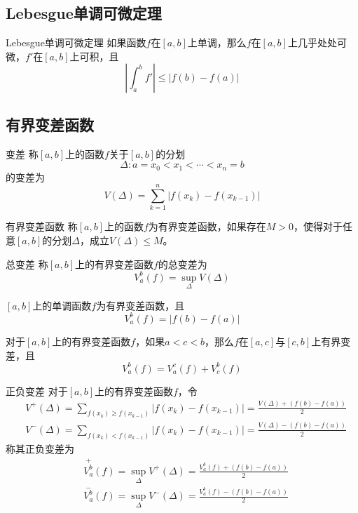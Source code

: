 \documentclass[lang = cn, scheme = chinese, thmcnt = section]{elegantbook}
\begin{document}
\subsection{Lebesgue单调可微定理}

\begin{theorem}{Lebesgue单调可微定理}
	如果函数$f$在$[a,b]$上单调，那么$f$在$[a,b]$上几乎处处可微，$f'$在$[a,b]$上可积，且
	$$
	\left| \int_{a}^{b}f' \right|\le|f(b)-f(a)|
	$$
\end{theorem}

\subsection{有界变差函数}

\begin{definition}{变差}
	称$[a,b]$上的函数$f$关于$[a,b]$的分划%
	$$
	\Delta: a=x_0<x_1<\cdots<x_n=b
	$$
	的变差为%
	$$
	V(\Delta)=\sum_{k=1}^{n}|f(x_k)-f(x_{k-1})|
	$$
\end{definition}

\begin{definition}{有界变差函数}
	称$[a,b]$上的函数$f$为有界变差函数，如果存在$M>0$，使得对于任意$[a,b]$的分划$\Delta$，成立$V(\Delta)\le M$。
\end{definition}

\begin{definition}{总变差}
	称$[a,b]$上的有界变差函数$f$的总变差为%
	$$
	V_a^b(f)=\sup_{\Delta}V(\Delta)
	$$
\end{definition}

\begin{lemma}
	$[a,b]$上的单调函数$f$为有界变差函数，且%
	$$
	V_a^b(f)=|f(b)-f(a)|
	$$
\end{lemma}

\begin{lemma}
	对于$[a,b]$上的有界变差函数$f$，如果$a<c<b$，那么$f$在$[a,c]$与$[c,b]$上有界变差，且%
	$$
	V_a^b(f)=V_a^c(f)+V_c^b(f)
	$$
\end{lemma}

\begin{definition}{正负变差}
	对于$[a,b]$上的有界变差函数$f$，令
	\begin{align*}
		& V^+(\Delta)=\sum_{f(x_k)\ge f(x_{k-1})}|f(x_k)-f(x_{k-1})|=\frac{V(\Delta)+(f(b)-f(a))}{2}\\
		& V^-(\Delta)=\sum_{f(x_k)< f(x_{k-1})}|f(x_k)-f(x_{k-1})|=\frac{V(\Delta)-(f(b)-f(a))}{2}
	\end{align*}
	称其正负变差为
	\begin{align*}
		& \overset{+}{V_a^b}(f)=\sup_{\Delta}V^+(\Delta)=\frac{V_a^b(f)+(f(b)-f(a))}{2}\\
		& \overset{-}{V_a^b}(f)=\sup_{\Delta}V^-(\Delta)=\frac{V_a^b(f)-(f(b)-f(a))}{2}
	\end{align*}
\end{definition}
\end{document}
